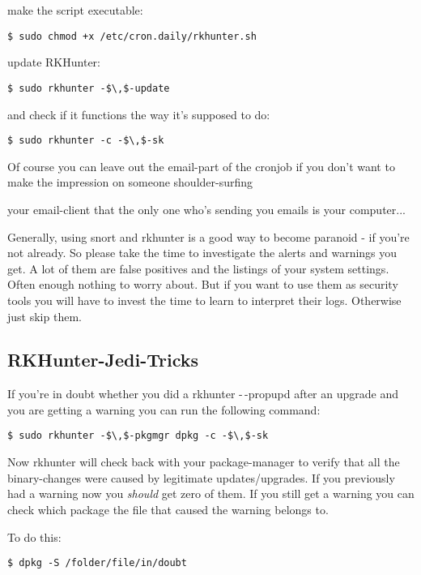 \documentclass{article}
\begin{document}
 make the script executable:
\begin{lstlisting}
$ sudo chmod +x /etc/cron.daily/rkhunter.sh
\end{lstlisting}



 update RKHunter:
\begin{lstlisting}
$ sudo rkhunter -$\,$-update
\end{lstlisting}



 and check if it functions the way it's supposed to do:
\begin{lstlisting}
$ sudo rkhunter -c -$\,$-sk
\end{lstlisting}



 Of course you can leave out the email-part of the cronjob if you don't want to make the impression on someone shoulder-surfing

your email-client that the only one who's sending you emails is your computer... 


 Generally, using snort and rkhunter is a good way to become paranoid - if you're not already. So please take the time to investigate the alerts and warnings you get. A lot of them are false positives and the listings of your system settings. Often enough nothing to worry about. But if you want to use them as security tools you will have to invest the time to learn to interpret their logs. Otherwise just skip them.
\subsection{RKHunter-Jedi-Tricks}


 If you're in doubt whether you did a rkhunter -$\,$-propupd after an upgrade and you are getting a warning you can run the following command:
\begin{lstlisting}
$ sudo rkhunter -$\,$-pkgmgr dpkg -c -$\,$-sk
\end{lstlisting}



 Now rkhunter will check back with your package-manager to verify that all the binary-changes were caused by legitimate updates/upgrades. If you previously had a warning now you \emph{should} get zero of them. If you still get a warning you can check which package the file that caused the warning belongs to. 


 To do this:
\begin{lstlisting}
$ dpkg -S /folder/file/in/doubt
\end{lstlisting}
\end{document}
